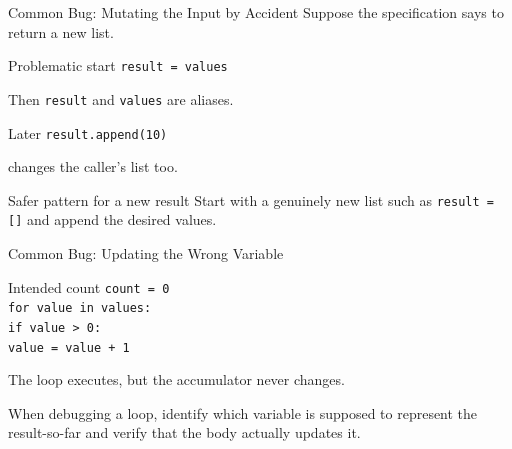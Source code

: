 \documentclass[aspectratio=169,10pt]{beamer}
\begin{document}
\begin{frame}{Common Bug: Mutating the Input by Accident}
  Suppose the specification says to return a new list.

  \begin{block}{Problematic start}
    \texttt{result = values}
  \end{block}

  Then \texttt{result} and \texttt{values} are aliases.

  \begin{block}{Later}
    \texttt{result.append(10)}
  \end{block}

  changes the caller's list too.

  \begin{alertblock}{Safer pattern for a new result}
    Start with a genuinely new list such as \texttt{result = []} and append the desired values.
  \end{alertblock}
\end{frame}

\begin{frame}{Common Bug: Updating the Wrong Variable}
  \begin{block}{Intended count}
    \texttt{count = 0}\\
    \texttt{for value in values:}\\
    \hspace{0.20in}\texttt{if value > 0:}\\
    \hspace{0.40in}\texttt{value = value + 1}
  \end{block}

  The loop executes, but the accumulator never changes.

  \begin{keyidea}
    When debugging a loop, identify which variable is supposed to represent the result-so-far and verify that the body actually updates it.
  \end{keyidea}
\end{frame}
\end{document}
